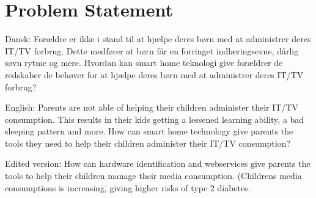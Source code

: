 \chapter{Problem Statement}

Dansk: Forældre er ikke i stand til at hjælpe deres børn med at administrer deres IT/TV forbrug.
Dette medfører at børn får en forringet indlæringsevne, dårlig søvn rytme og mere.
Hvordan kan smart home teknologi give forældrer de redskaber de behøver for at hjælpe deres børn med at administrer deres IT/TV forbrug?



English: Parents are not able of helping their children administer their IT/TV consumption.
This results in their kids getting a lessened learning ability, a bad sleeping pattern and more.
How can smart home technology give parents the tools they need to help their children administer their IT/TV consumption?

Edited version:
How can hardware identification and webservices give parents the tools to help their children manage their media consumption. 
(Childrens media consumptions is increasing, giving higher risks of type 2 diabetes.